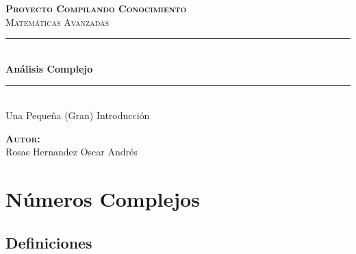 \documentclass[12pt, fleqn]{report}                             %
\author{Oscar Andrés Rosas}                                     %
\begin{document}
\begin{titlepage}

	\center
	\textbf{\textsc{\Large Proyecto Compilando Conocimiento}}\\[1.0cm] 
	\textsc{\Large Matemáticas Avanzadas}\\[1.0cm] 

	\rule{\linewidth}{0.5mm} \\[1.0cm]
		{ \huge \bfseries Análisis Complejo}\\[1.0cm] 
	\rule{\linewidth}{0.5mm} \\[2.0cm]
	
	{\LARGE Una Pequeña (Gran) Introducción}\\[7cm] 
	
	\begin{center} \large
	\textbf{\textsc{Autor:}}\\
	Rosas Hernandez Oscar Andrés
	\end{center}

	\vfill

\end{titlepage}

\tableofcontents{}
\label{sec:Index}

\clearpage




\part{Números Complejos}
\clearpage


    \chapter{Definiciones}
\end{document}
